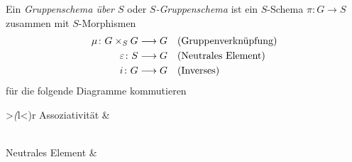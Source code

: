 \begin{Definition}[$S$"=Gruppenschema]\label{def:gruppenschema}
  Ein \emph{Gruppenschema über $S$} oder \emph{$S$-Gruppenschema} ist ein
  $S$-Schema ${\pi\colon G\to S}$ zusammen mit $S$-Morphismen
  \begin{align*}
    \mu\colon G\times_S G &\longrightarrow G
    &&\text{(Gruppenverknüpfung)}\\
    \varepsilon\colon S&\longrightarrow G 
    &&\text{(Neutrales Element)}\\
    i\colon G &\longrightarrow G    
    &&\text{(Inverses)}
  \end{align*}
  für die folgende Diagramme kommutieren\\[1em]
  \begin{tabular}{>{\itshape(}l<{)}r}
    Assoziativität
    &
    \\[3.5em]
    Neutrales Element
    &
\end{tabular}
\end{Definition}
